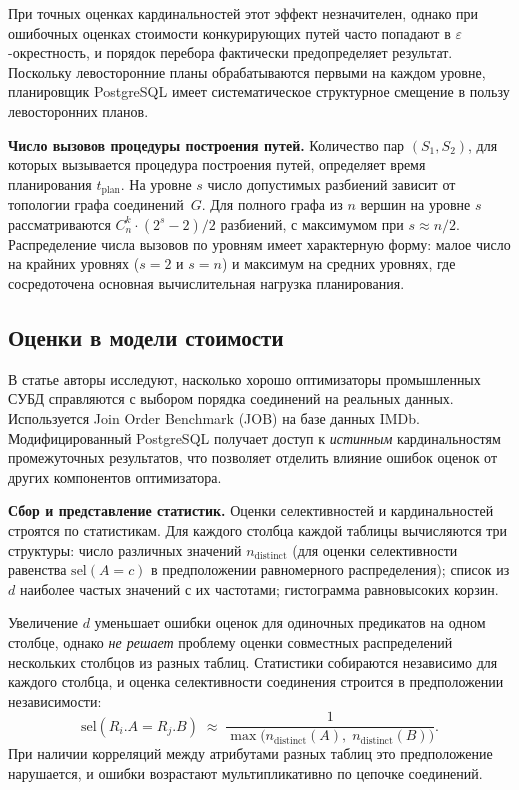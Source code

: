 При точных оценках кардинальностей этот эффект незначителен, однако при ошибочных оценках 
стоимости конкурирующих путей часто попадают в $\varepsilon$-окрестность, и порядок перебора
фактически предопределяет результат.
Поскольку левосторонние планы обрабатываются первыми на каждом уровне,
планировщик PostgreSQL имеет систематическое структурное смещение
в пользу левосторонних планов.
\par

\textbf{Число вызовов процедуры построения путей.}
Количество пар $(S_1, S_2)$, для которых вызывается процедура построения путей,
определяет время планирования $t_{\mathrm{plan}}$.
На уровне $s$ число допустимых разбиений зависит от топологии графа
соединений~$G$.
Для полного графа из $n$ вершин на уровне $s$ рассматриваются $ C_{n}^{k} \cdot (2^s - 2) / 2$ разбиений, с максимумом при $s \approx n/2$.
Распределение числа вызовов по уровням имеет характерную форму:
малое число на крайних уровнях ($s = 2$ и $s = n$)
и максимум на средних уровнях, где сосредоточена основная
вычислительная нагрузка планирования.
\par

\subsection{Оценки в модели стоимости}

В статье \cite{HowGoodJournal} авторы исследуют, насколько хорошо оптимизаторы промышленных СУБД
справляются с выбором порядка соединений на реальных данных.
Используется Join Order Benchmark (JOB) на базе данных IMDb.
Модифицированный PostgreSQL получает доступ к \emph{истинным} кардинальностям промежуточных
результатов, что позволяет отделить влияние ошибок оценок от других компонентов оптимизатора.
\par

\textbf{Сбор и представление статистик.}
Оценки селективностей и кардинальностей строятся по статистикам.
Для каждого столбца каждой таблицы вычисляются три структуры:
число различных значений $n_{\mathrm{distinct}}$
(для оценки селективности равенства
$\mathrm{sel}(A = c)$
в предположении равномерного распределения);
список из $d$ наиболее частых значений с их частотами;
гистограмма равновысоких корзин.
\par

Увеличение $d$ уменьшает ошибки оценок для одиночных предикатов
на одном столбце, однако \emph{не решает} проблему оценки совместных
распределений нескольких столбцов из разных таблиц.
Статистики собираются независимо для каждого столбца,
и оценка селективности соединения строится в предположении независимости:
\[
    \mathrm{sel}(R_i.A = R_j.B) \;\approx\;
    \frac{1}{\max\bigl(n_{\mathrm{distinct}}(A),\; n_{\mathrm{distinct}}(B)\bigr)}.
\]
При наличии корреляций между атрибутами разных таблиц 
это предположение нарушается, и ошибки возрастают мультипликативно
по цепочке соединений.
\par

